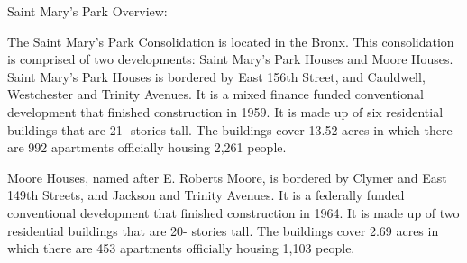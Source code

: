 Saint Mary's Park Overview:    

  

The Saint Mary's Park Consolidation is located in the Bronx. This consolidation is comprised of two developments: Saint Mary's Park Houses and Moore Houses. Saint Mary's Park Houses is bordered by East 156th Street, and Cauldwell, Westchester and Trinity Avenues. It is a mixed finance funded conventional development that finished construction in 1959. It is made up of six residential buildings that are 21- stories tall. The buildings cover 13.52 acres in which there are 992 apartments officially housing 2,261 people.

Moore Houses, named after E. Roberts Moore, is bordered by Clymer and East 149th Streets, and Jackson and Trinity Avenues. It is a federally funded conventional development that finished construction in 1964. It is made up of two residential buildings that are 20- stories tall. The buildings cover 2.69 acres in which there are 453 apartments officially housing 1,103 people.